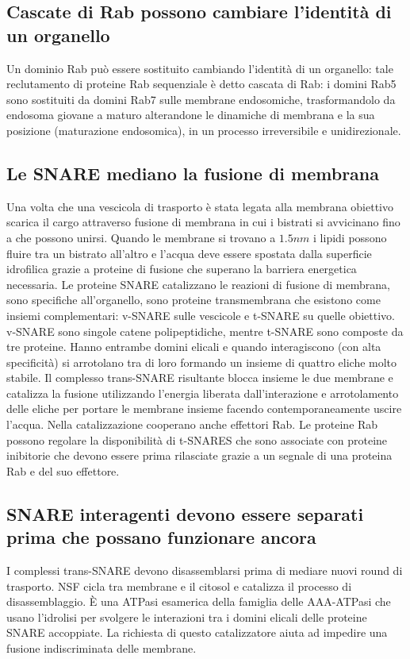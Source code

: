 \subsection{Cascate di Rab possono cambiare l'identit\`a di un organello}
Un dominio Rab pu\`o essere sostituito cambiando l'identit\`a di un organello: tale reclutamento di proteine Rab sequenziale \`e detto cascata di Rab: i domini Rab5 sono sostituiti
da domini Rab7 sulle membrane endosomiche, trasformandolo da endosoma giovane a maturo alterandone le dinamiche di membrana e la sua posizione (maturazione endosomica), in un processo
irreversibile e unidirezionale.
\subsection{Le SNARE mediano la fusione di membrana}
Una volta che una vescicola di trasporto \`e stata legata alla membrana obiettivo scarica il cargo attraverso fusione di membrana in cui i bistrati si avvicinano fino a che possono
unirsi. Quando le membrane si trovano a $1.5nm$ i lipidi possono fluire tra un bistrato all'altro e l'acqua deve essere spostata dalla superficie idrofilica grazie a proteine di
fusione che superano la barriera energetica necessaria. Le proteine SNARE catalizzano le reazioni di fusione di membrana, sono specifiche all'organello, sono proteine transmembrana che
esistono come insiemi complementari: v-SNARE sulle vescicole e t-SNARE su quelle obiettivo. v-SNARE sono singole catene polipeptidiche, mentre t-SNARE sono composte da tre proteine.
Hanno entrambe domini elicali e quando interagiscono (con alta specificit\`a) si arrotolano tra di loro formando un insieme di quattro eliche molto stabile. Il complesso trans-SNARE 
risultante blocca insieme le due membrane e catalizza la fusione utilizzando l'energia liberata dall'interazione e arrotolamento delle eliche per portare le membrane insieme facendo
contemporaneamente uscire l'acqua. Nella catalizzazione cooperano anche effettori Rab. Le proteine Rab possono regolare la disponibilit\`a di t-SNARES che sono associate con
proteine inibitorie che devono essere prima rilasciate grazie a un segnale di una proteina Rab e del suo effettore. 
\subsection{SNARE interagenti devono essere separati prima che possano funzionare ancora}
I complessi trans-SNARE devono disassemblarsi prima di mediare nuovi round di trasporto. NSF cicla tra membrane e il citosol e catalizza il processo di disassemblaggio. \`E una ATPasi
esamerica della famiglia delle AAA-ATPasi che usano l'idrolisi per svolgere le interazioni tra i domini elicali delle proteine SNARE accoppiate. La richiesta di questo catalizzatore
aiuta ad impedire una fusione indiscriminata delle membrane. 
